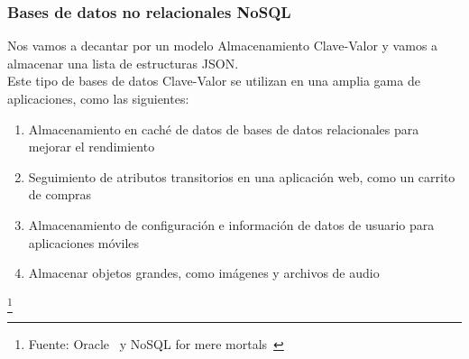 \subsubsection{Bases de datos no relacionales NoSQL}
Nos vamos a decantar por un modelo Almacenamiento Clave-Valor
 y vamos a almacenar una lista de estructuras JSON.
\\
Este tipo de bases de datos Clave-Valor se utilizan en una amplia gama
 de aplicaciones, como las siguientes:
\begin{enumerate}
\item Almacenamiento en caché de datos de bases de datos 
relacionales para mejorar el rendimiento
\item Seguimiento de atributos transitorios en una aplicación web, 
como un carrito de compras
\item Almacenamiento de configuración e información de datos de usuario
 para aplicaciones móviles
\item Almacenar objetos grandes, como imágenes y archivos de audio
\end{enumerate}
\footnote{Fuente: Oracle~\cite{DEFINICIONNOSQL} y NoSQL for mere mortals~\cite{NOSQL}}

